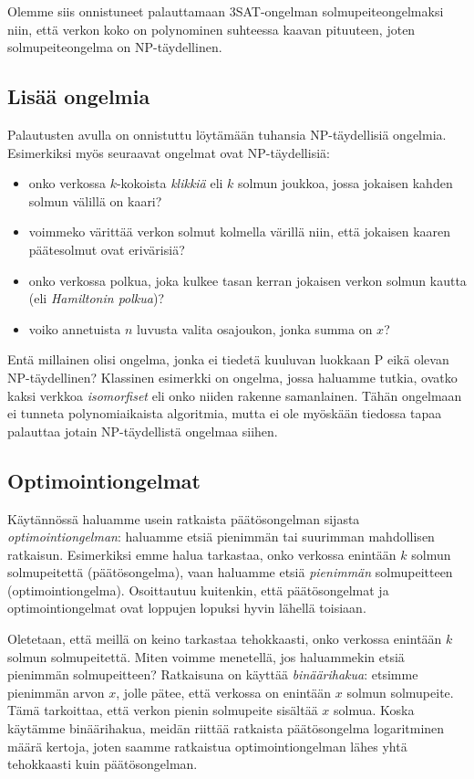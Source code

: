 Olemme siis onnistuneet palauttamaan 3SAT-ongelman solmupeiteongelmaksi
niin, että verkon koko on polynominen suhteessa kaavan pituuteen,
joten solmupeiteongelma on NP-täydellinen.

\subsection{Lisää ongelmia}

Palautusten avulla on onnistuttu löytämään tuhansia NP-täydellisiä ongelmia.
Esimerkiksi myös seuraavat ongelmat ovat NP-täydellisiä:

\begin{itemize}
\item onko verkossa $k$-kokoista \emph{klikkiä} eli $k$ solmun joukkoa,
jossa jokaisen kahden solmun välillä on kaari?
\item voimmeko värittää verkon solmut kolmella värillä niin,
että jokaisen kaaren päätesolmut ovat erivärisiä?
\item onko verkossa polkua, joka kulkee tasan kerran jokaisen
verkon solmun kautta (eli \emph{Hamiltonin polkua})?
\item voiko annetuista $n$ luvusta valita osajoukon, jonka summa on $x$?
\end{itemize}

Entä millainen olisi ongelma, jonka ei tiedetä kuuluvan luokkaan P
eikä olevan NP-täydellinen?
Klassinen esimerkki on ongelma, jossa haluamme tutkia,
ovatko kaksi verkkoa \emph{isomorfiset} eli onko niiden
rakenne samanlainen.
Tähän ongelmaan ei tunneta polynomiaikaista algoritmia,
mutta ei ole myöskään tiedossa tapaa palauttaa
jotain NP-täydellistä ongelmaa siihen.

\subsection{Optimointiongelmat}

Käytännössä haluamme usein ratkaista päätösongelman
sijasta \emph{optimointiongelman}: haluamme etsiä pienimmän
tai suurimman mahdollisen ratkaisun.
Esimerkiksi emme halua tarkastaa, onko verkossa
enintään $k$ solmun solmupeitettä (päätösongelma),
vaan haluamme etsiä \emph{pienimmän} solmupeitteen (optimointiongelma).
Osoittautuu kuitenkin, että päätösongelmat ja optimointiongelmat
ovat loppujen lopuksi hyvin lähellä toisiaan.

Oletetaan, että meillä on keino tarkastaa tehokkaasti,
onko verkossa enin\-tään $k$ solmun solmupeitettä.
Miten voimme menetellä, jos haluammekin etsiä pienimmän
solmupeitteen?
Ratkaisuna on käyttää \emph{binäärihakua}:
etsimme pienimmän arvon $x$, jolle pätee,
että verkossa on enintään $x$ solmun solmupeite.
Tämä tarkoittaa, että verkon pienin solmupeite
sisältää $x$ solmua.
Koska käytämme binäärihakua, meidän riittää ratkaista
päätösongelma logaritminen määrä kertoja,
joten saamme ratkaistua optimointiongelman lähes yhtä
tehokkaasti kuin päätösongelman.

